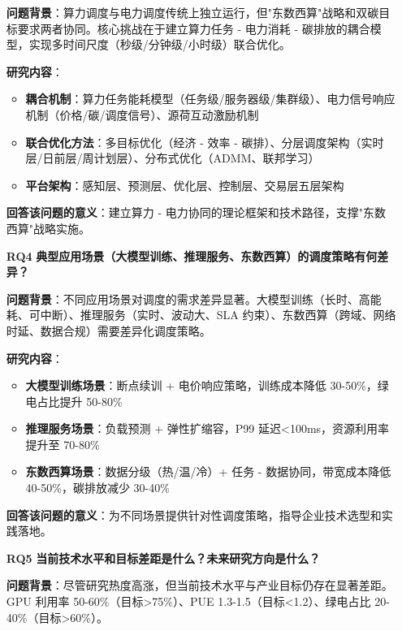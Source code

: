 \documentclass[12pt,a4paper]{article}
\begin{document}
\begin{itemize}
    \textbf{问题背景}：算力调度与电力调度传统上独立运行，但"东数西算"战略和双碳目标要求两者协同。核心挑战在于建立算力任务 - 电力消耗 - 碳排放的耦合模型，实现多时间尺度（秒级/分钟级/小时级）联合优化。
    
    \textbf{研究内容}：
    \begin{itemize}
        \item \textbf{耦合机制}：算力任务能耗模型（任务级/服务器级/集群级）、电力信号响应机制（价格/碳/调度信号）、源荷互动激励机制
        \item \textbf{联合优化方法}：多目标优化（经济 - 效率 - 碳排）、分层调度架构（实时层/日前层/周计划层）、分布式优化（ADMM、联邦学习）
        \item \textbf{平台架构}：感知层、预测层、优化层、控制层、交易层五层架构
    \end{itemize}
    
    \textbf{回答该问题的意义}：建立算力 - 电力协同的理论框架和技术路径，支撑"东数西算"战略实施。
    
    \item[\textbf{RQ4}] \textbf{典型应用场景（大模型训练、推理服务、东数西算）的调度策略有何差异？}
    
    \textbf{问题背景}：不同应用场景对调度的需求差异显著。大模型训练（长时、高能耗、可中断）、推理服务（实时、波动大、SLA 约束）、东数西算（跨域、网络时延、数据合规）需要差异化调度策略。
    
    \textbf{研究内容}：
    \begin{itemize}
        \item \textbf{大模型训练场景}：断点续训 + 电价响应策略，训练成本降低 30-50\%，绿电占比提升 50-80\%
        \item \textbf{推理服务场景}：负载预测 + 弹性扩缩容，P99 延迟<100ms，资源利用率提升至 70-80\%
        \item \textbf{东数西算场景}：数据分级（热/温/冷）+ 任务 - 数据协同，带宽成本降低 40-50\%，碳排放减少 30-40\%
    \end{itemize}
    
    \textbf{回答该问题的意义}：为不同场景提供针对性调度策略，指导企业技术选型和实践落地。
    
    \item[\textbf{RQ5}] \textbf{当前技术水平和目标差距是什么？未来研究方向是什么？}
    
    \textbf{问题背景}：尽管研究热度高涨，但当前技术水平与产业目标仍存在显著差距。GPU 利用率 50-60\%（目标>75\%）、PUE 1.3-1.5（目标<1.2）、绿电占比 20-40\%（目标>60\%）。
    

\end{itemize}
\end{document}
